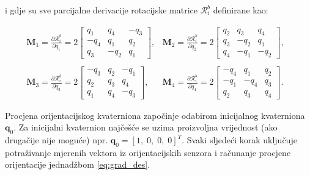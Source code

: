 \documentclass[times, utf8, diplomski, numeric]{templates/template}
\begin{document}
{{{{                i gdje su sve parcijalne derivacije rotacijske matrice $\mathcal{R}_i^b$ definirane kao:

                \begin{equation}
                \begin{array}{rcl}
                    \boldsymbol{M}_1 = \frac{\partial \mathcal{R}_i^b}{\partial q_1} = 2
                    \begin{bmatrix}
                        q_1 & q_4 & -q_3 \\
                        -q_4 & q_1 & q_2 \\
                        q_3 & -q_2 & q_1 
                    \end{bmatrix},
                    & 
                    \boldsymbol{M}_2 = \frac{\partial \mathcal{R}_i^b}{\partial q_2} = 2
                    \begin{bmatrix}
                        q_2 & q_3 & q_4 \\
                        q_3 & -q_2 & q_1 \\
                        q_4 & -q_1 & -q_2 
                    \end{bmatrix},
                    \\
                    & & \\
                    \boldsymbol{M}_3 = \frac{\partial \mathcal{R}_i^b}{\partial q_3} = 2
                    \begin{bmatrix}
                        -q_3 & q_2 & -q_1 \\
                        q_2 & q_3 & q_4\\
                        q_1 & q_4 & -q_3 
                    \end{bmatrix},
                    & 
                    \boldsymbol{M}_4 = \frac{\partial \mathcal{R}_i^b}{\partial q_4} = 2
                    \begin{bmatrix}
                        -q_4 & q_1 & q_2 \\
                        -q_1 & -q_4 & q_3 \\
                        q_2 & q_3 & q_4 
                    \end{bmatrix}.
                \end{array}
                \end{equation}

                Procjena orijentacijskog kvaterniona započinje odabirom inicijalnog kvaterniona $\boldsymbol{q}_0$. Za inicijalni kvaternion najčešće se uzima proizvoljna vrijednost (ako drugačije nije moguće) npr. $\boldsymbol{q}_0 = \left[1, \; 0, \; 0, \; 0\right]^T$. Svaki sljedeći korak uključuje potraživanje mjerenih vektora iz orijentacijskih senzora i računanje procjene orijentacije jednadžbom \ref{eq:grad_des}.

}}}}
\end{document}
